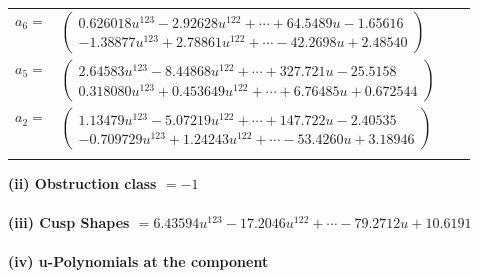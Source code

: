\documentclass[1p]{elsarticle_modified}
\theoremstyle{definition}
\begin{document}
\begin{tabular}{m{7pt} m{180pt} m{7pt} m{180pt} }
\flushright $a_{6}=$&$\begin{pmatrix}0.626018 u^{123}-2.92628 u^{122}+\cdots+64.5489 u-1.65616\\-1.38877 u^{123}+2.78861 u^{122}+\cdots-42.2698 u+2.48540\end{pmatrix}$ \\
\flushright $a_{5}=$&$\begin{pmatrix}2.64583 u^{123}-8.44868 u^{122}+\cdots+327.721 u-25.5158\\0.318080 u^{123}+0.453649 u^{122}+\cdots+6.76485 u+0.672544\end{pmatrix}$ \\
\flushright $a_{2}=$&$\begin{pmatrix}1.13479 u^{123}-5.07219 u^{122}+\cdots+147.722 u-2.40535\\-0.709729 u^{123}+1.24243 u^{122}+\cdots-53.4260 u+3.18946\end{pmatrix}$\\&\end{tabular}
\flushleft \textbf{(ii) Obstruction class $= -1$}\\~\\
\flushleft \textbf{(iii) Cusp Shapes $= 6.43594 u^{123}-17.2046 u^{122}+\cdots-79.2712 u+10.6191$}\\~\\
\newpage\renewcommand{\arraystretch}{1}
\flushleft \textbf{(iv) u-Polynomials at the component}\newline \\
\end{document}
